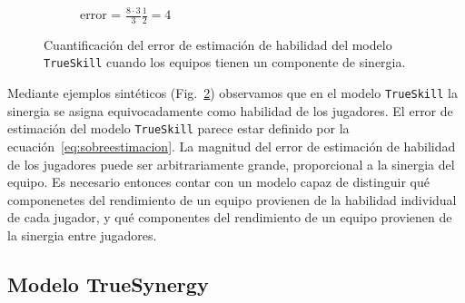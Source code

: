 \documentclass[a4paper,11pt]{book}
\theoremstyle{definition}
\begin{document}
\begin{figure}[H]
\begin{subfigure}[t]{0.32\textwidth}
  \caption{\scriptsize error = $\frac{8\cdot3}{3}\frac{1}{2} = 4$}\label{F8}
  \end{subfigure}
  \caption{Cuantificaci\'on del error de estimaci\'on de habilidad del modelo \texttt{TrueSkill} cuando los equipos tienen un componente de sinergia.}
  \label{fig:sobreestimacion}
\end{figure}

Mediante ejemplos sint\'eticos (Fig.~\ref{fig:sobreestimacion}) observamos que en el modelo \texttt{TrueSkill} la sinergia se asigna equivocadamente como habilidad de los jugadores.
El error de estimaci\'on del modelo \texttt{TrueSkill} parece estar definido por la ecuaci\'on~\ref{eq:sobreestimacion}.
La magnitud del error de estimaci\'on de habilidad de los jugadores puede ser arbitrariamente grande, proporcional a la sinergia del equipo.
Es necesario entonces contar con un modelo capaz de distinguir qu\'e componenetes del rendimiento de un equipo provienen de la habilidad individual de cada jugador, y qu\'e componentes del rendimiento de un equipo provienen de la sinergia entre jugadores. 

\subsection{Modelo TrueSynergy}
\end{document}
